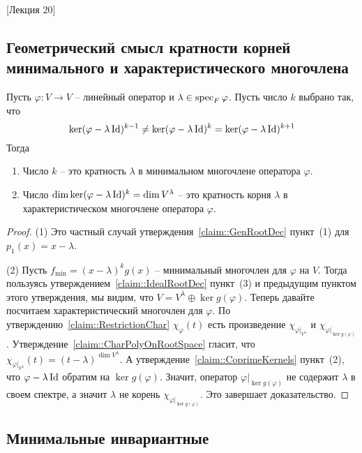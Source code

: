 [Лекция 20]


\subsection{Геометрический смысл кратности корней минимального и характеристического многочлена}

\begin{claim}
\label{claim::RootMultGeom}
Пусть $\varphi\colon V \to V$ -- линейный оператор и $\lambda \in \operatorname{spec}_F \varphi$.
Пусть число $k$ выбрано так, что
\[
\ker (\varphi-\lambda\operatorname{Id})^{k-1} \neq \ker (\varphi-\lambda\operatorname{Id})^k = \ker (\varphi-\lambda\operatorname{Id})^{k+1}
\]
Тогда
\begin{enumerate}
\item Число $k$ -- это кратность $\lambda$ в минимальном многочлене оператора $\varphi$.

\item Число $\dim \ker(\varphi - \lambda \operatorname{Id})^k = \dim V^\lambda$ -- это кратность корня $\lambda$ в характеристическом многочлене оператора $\varphi$.
\end{enumerate}
\end{claim}
\begin{proof}
(1) Это частный случай утверждения~\ref{claim::GenRootDec} пункт~(1) для $p_1(x) = x-\lambda$.

(2) Пусть $f_\text{min} = (x-\lambda)^k g(x)$ -- минимальный многочлен для $\varphi$ на $V$.
Тогда пользуясь утверждением~\ref{claim::IdealRootDec} пункт~(3) и предыдущим пунктом этого утверждения, мы видим, что $V = V^\lambda \oplus \ker g(\varphi)$.
Теперь давайте посчитаем характеристический многочлен для $\varphi$.
По утверждению~\ref{claim::RestrictionChar} $\chi_\varphi(t)$ есть произведение $\chi_{\varphi|_{V^\lambda}}$ и $\chi_{\varphi|_{\ker g(\varphi)}}$.
Утверждение~\ref{claim::CharPolyOnRootSpace} гласит, что $\chi_{\varphi|_{V^\lambda}}(t) = (t - \lambda)^{\dim V^\lambda}$.
А утверждение~\ref{claim::CoprimeKernels} пункт~(2), что $\varphi - \lambda\operatorname{Id}$ обратим на $\ker g(\varphi)$.
Значит, оператор $\varphi|_{\ker g(\varphi)}$ не содержит $\lambda$ в своем спектре, а значит $\lambda$ не корень $\chi_{\varphi|_{\ker g(\varphi)}}$.
Это завершает доказательство.
\end{proof}

\subsection{Минимальные инвариантные}

